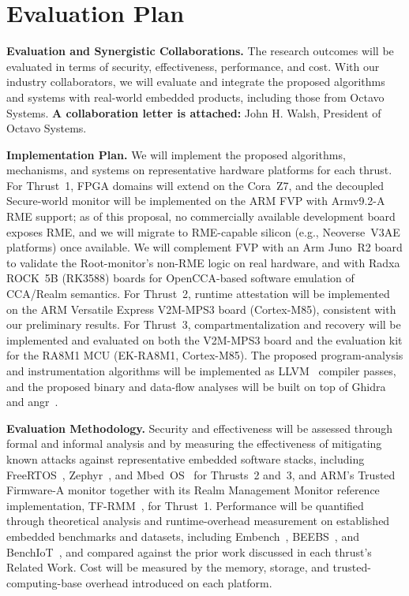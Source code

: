 
\section{Evaluation Plan}

\textbf{Evaluation and Synergistic Collaborations.}
The research outcomes will be evaluated in terms of security, effectiveness, performance, and cost.
With our industry collaborators, we will evaluate and integrate the proposed algorithms and systems with real-world embedded products, including those from Octavo Systems.
\textbf{A collaboration letter is attached:} John H. Walsh, President of Octavo Systems.

\textbf{Implementation Plan.}
We will implement the proposed algorithms, mechanisms, and systems on representative hardware platforms for each thrust.
For Thrust~1, FPGA domains will extend \byotee on the Cora~Z7, and the decoupled Secure-world monitor will be implemented on the ARM FVP with Armv9.2-A RME support; as of this proposal, no commercially available development board exposes RME, and we will migrate to RME-capable silicon (e.g., Neoverse~V3AE platforms) once available.
We will complement FVP with an Arm Juno~R2 board to validate the Root-monitor's non-RME logic on real hardware, and with Radxa ROCK~5B (RK3588) boards for OpenCCA-based software emulation of CCA/Realm semantics.
For Thrust~2, runtime attestation will be implemented on the ARM Versatile Express V2M-MPS3 board (Cortex-M85), consistent with our preliminary \enola results. For Thrust~3, compartmentalization and recovery will be implemented and evaluated on both the V2M-MPS3 board and the evaluation kit for the RA8M1 MCU (EK-RA8M1, Cortex-M85). The proposed program-analysis and instrumentation algorithms will be implemented as LLVM~\cite{lattner2004llvm} compiler passes, and the proposed binary and data-flow analyses will be built on top of Ghidra~\cite{ghidra} and angr~\cite{shoshitaishvili2016sok}.

\textbf{Evaluation Methodology.}
Security and effectiveness will be assessed through formal and informal analysis and by measuring the effectiveness of mitigating known attacks against representative embedded software stacks, including FreeRTOS~\cite{freertos}, Zephyr~\cite{Zephyr}, and Mbed~OS~\cite{MbedOS} for Thrusts~2 and~3, and ARM's Trusted Firmware-A monitor together with its Realm Management Monitor reference implementation, TF-RMM~\cite{TFRMM}, for Thrust~1. Performance will be quantified through theoretical analysis and runtime-overhead measurement on established embedded benchmarks and datasets, including Embench~\cite{embenchIOT}, BEEBS~\cite{pallister2013beebs}, and BenchIoT~\cite{almakhdhub2019benchiot}, and compared against the prior work discussed in each thrust's Related Work. Cost will be measured by the memory, storage, and trusted-computing-base overhead introduced on each platform.

